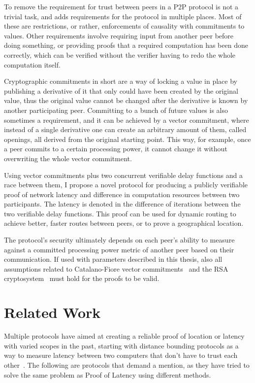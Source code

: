 To remove the requirement for trust between peers in a P2P protocol is not a trivial task, and adds requirements for the protocol in multiple places. Most of these are restrictions, or rather, enforcements of causality with commitments to values. Other requirements involve requiring input from another peer before doing something, or providing proofs that a required computation has been done correctly, which can be verified without the verifier having to redo the whole computation itself.

Cryptographic commitments in short are a way of locking a value in place by publishing a derivative of it that only could have been created by the original value, thus the original value cannot be changed after the derivative is known by another participating peer. Committing to a bunch of future values is also sometimes a requirement, and it can be achieved by a vector commitment, where instead of a single derivative one can create an arbitrary amount of them, called openings, all derived from the original starting point. This way, for example, once a peer commits to a certain processing power, it cannot change it without overwriting the whole vector commitment.



Using vector commitments plus two concurrent verifiable delay functions and a race between them, I propose a novel protocol for producing a publicly verifiable proof of network latency and difference in computation resources between two participants. The latency is denoted in the difference of iterations between the two verifiable delay functions. This proof can be used for dynamic routing to achieve better, faster routes between peers, or to prove a geographical location.

The protocol's security ultimately depends on each peer's ability to measure against a committed processing power metric of another peer based on their communication. If used with parameters described in this thesis, also all assumptions related to Catalano-Fiore vector commitments~\cite{Catalano2013-jn} and the RSA cryptosystem~\cite{Rivest1978-fm} must hold for the proofs to be valid.

\section{Related Work}
Multiple protocols have aimed at creating a reliable proof of location or latency with varied scopes in the past, starting with distance bounding protocols as a way to measure latency between two computers that don't have to trust each other~\cite{Brands1994-hz}. The following are protocols that demand a mention, as they have tried to solve the same problem as Proof of Latency using different methods.


